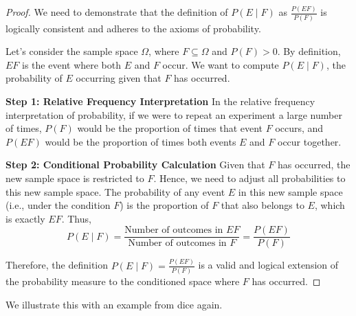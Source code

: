 \begin{proof}
    We need to demonstrate that the definition of \( P(E \mid F) \) as \( \frac{P(EF)}{P(F)} \) is logically consistent and adheres to the axioms of probability.
    
    Let's consider the sample space \(\Omega\), where \( F \subseteq \Omega \) and \( P(F) > 0 \). By definition, \( EF \) is the event where both \( E \) and \( F \) occur. We want to compute \( P(E \mid F) \), the probability of \( E \) occurring given that \( F \) has occurred.
    
    \textbf{Step 1: Relative Frequency Interpretation}
    In the relative frequency interpretation of probability, if we were to repeat an experiment a large number of times, \( P(F) \) would be the proportion of times that event \( F \) occurs, and \( P(EF) \) would be the proportion of times both events \( E \) and \( F \) occur together.
    
    \textbf{Step 2: Conditional Probability Calculation}
    Given that \( F \) has occurred, the new sample space is restricted to \( F \). Hence, we need to adjust all probabilities to this new sample space. The probability of any event \( E \) in this new sample space (i.e., under the condition \( F \)) is the proportion of \( F \) that also belongs to \( E \), which is exactly \( EF \). Thus,
    \[
    P(E \mid F) = \frac{\text{Number of outcomes in } EF}{\text{Number of outcomes in } F} = \frac{P(EF)}{P(F)}
    \]
    
    Therefore, the definition \( P(E \mid F) = \frac{P(EF)}{P(F)} \) is a valid and logical extension of the probability measure to the conditioned space where \( F \) has occurred.
    \end{proof}
    
We illustrate this with an example from dice again.

